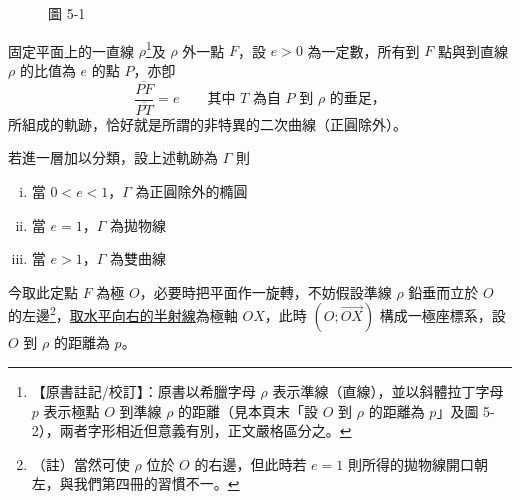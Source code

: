 \begin{figure}[H]
\centering
{}
\caption*{圖 5-1}
\label{fig:b5s-5-1}
\end{figure}

固定平面上的一直線 $\rho$\label{note:b5s-ch1-p46-rho}\footnote{【原書註記/校訂】：原書以希臘字母 $\rho$ 表示準線（直線），並以斜體拉丁字母 $p$ 表示極點 $O$ 到準線 $\rho$ 的距離（見本頁末「設 $O$ 到 $\rho$ 的距離為 $p$」及圖 5-2），兩者字形相近但意義有別，正文嚴格區分之。}及 $\rho$ 外一點 $F$，設 $e > 0$ 為一定數，所有到 $F$ 點與到直線 $\rho$ 的比值為 $e$ 的點 $P$，亦卽
\[
  \frac{\overline{PF}}{\overline{PT}} = e \qquad \text{其中 $T$ 為自 $P$ 到 $\rho$ 的垂足，}
\]
所組成的軌跡，恰好就是所謂的非特異的二次曲線（正圓除外）。

若進一層加以分類，設上述軌跡為 $\Gamma$ 則
\begin{enumerate}[(i)]
  \item 當 $0 < e < 1$，$\Gamma$ 為正圓除外的橢圓
  \item 當 $e = 1$，$\Gamma$ 為拋物線
  \item 當 $e > 1$，$\Gamma$ 為雙曲線
\end{enumerate}

今取此定點 $F$ 為極 $O$，必要時把平面作一旋轉，不妨假設準線 $\rho$ 鉛垂而立於 $O$ 的左邊\footnote{（註）當然可使 $\rho$ 位於 $O$ 的右邊，但此時若 $e = 1$ 則所得的拋物線開口朝左，與我們第四冊的習慣不一。}，\underline{取水平向右的半射線}為極軸 $OX$，此時 $(O; \vec{OX})$ 構成一極座標系，設 $O$ 到 $\rho$ 的距離為 $p$。

